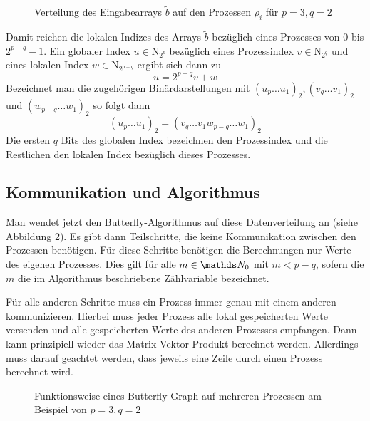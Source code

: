 			\begin{figure}[h]
				\center
				
				\caption{Verteilung des Eingabearrays $\tilde{b}$ auf den Prozessen $\rho_i$ für $p=3,q=2$}
				\label{fig:data-distribution}
			\end{figure}

			Damit reichen die lokalen Indizes des Arrays $\tilde{b}$ bezüglich eines Prozesses von $0$ bis $2^{p-q}-1$.
			Ein globaler Index $u\in\mathrm{N}_{2^p}$ bezüglich eines Prozessindex $v\in\mathrm{N}_{2^q}$ und eines lokalen Index $w\in\mathrm{N}_{2^{p-q}}$ ergibt sich dann zu
			\[ u = 2^{p-q}v + w \]
			Bezeichnet man die zugehörigen Binärdarstellungen mit $(u_p\ldots u_1)_2, (v_q\ldots v_1)_2$ und $(w_{p-q}\ldots w_1)_2$ so folgt dann
			\[ (u_p\ldots u_1)_2 = (v_q\ldots v_1 w_{p-q}\ldots w_1)_2 \]
			Die ersten $q$ Bits des globalen Index bezeichnen den Prozessindex und die Restlichen den lokalen Index bezüglich dieses Prozesses.

		

		\subsection{Kommunikation und Algorithmus} %
		\label{sub:kommunikation_und_algorithmus}

			Man wendet jetzt den Butterfly-Algorithmus auf diese Datenverteilung an (siehe Abbildung \ref{fig:butterfly-parallel}).
			Es gibt dann Teilschritte, die keine Kommunikation zwischen den Prozessen benötigen.
			Für diese Schritte benötigen die Berechnungen nur Werte des eigenen Prozesses.
			Dies gilt für alle $m\in\SN_0$ mit $m<p-q$, sofern die $m$ die im Algorithmus beschriebene Zählvariable bezeichnet.

			Für alle anderen Schritte muss ein Prozess immer genau mit einem anderen kommunizieren.
			Hierbei muss jeder Prozess alle lokal gespeicherten Werte versenden und alle gespeicherten Werte des anderen Prozesses empfangen.
			Dann kann prinzipiell wieder das Matrix-Vektor-Produkt berechnet werden.
			Allerdings muss darauf geachtet werden, dass jeweils eine Zeile durch einen Prozess berechnet wird.

			\begin{figure}[h]
				\center
				
				\caption{Funktionsweise eines Butterfly Graph auf mehreren Prozessen am Beispiel von $p=3,q=2$}
				\label{fig:butterfly-parallel}
			\end{figure}

